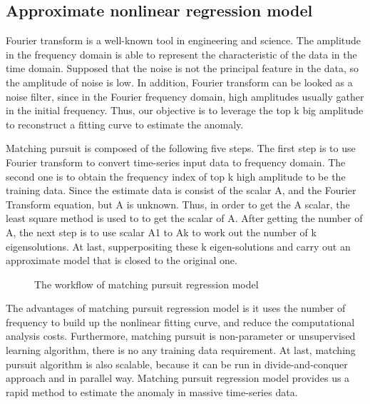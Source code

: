 \documentclass{vgtc}                          %
\begin{document}
\subsection{Approximate nonlinear regression model}

Fourier transform is a well-known tool in engineering and science. The amplitude in the frequency domain is able to represent the characteristic of the data in the time domain. Supposed that the noise is not the principal feature in the data, so the amplitude of noise is low. In addition, Fourier transform can be looked as a noise filter, since in the Fourier frequency domain, high amplitudes usually gather in the initial frequency. Thus, our objective is to leverage the top k big amplitude to reconstruct a fitting curve to estimate the anomaly. 

Matching pursuit is composed of the following five steps. The first step is to use Fourier transform to convert time-series input data to frequency domain. The second one is to obtain the frequency index of top k high amplitude to be the training data. Since the estimate data is consist of the scalar A, and the Fourier Transform equation, but A is unknown. Thus, in order to get the A scalar, the least square method is used to to get the scalar of A. After getting the number of A, the next step is to use scalar A1 to Ak to work out the number of k eigensolutions. At last, supperpositing these k eigen-solutions and carry out an approximate model that is closed to the original one.

\begin{figure}[htb]
	\caption{The workflow of matching pursuit regression model}
\end{figure}

The advantages of matching pursuit regression model is it uses the number of frequency to build up the nonlinear fitting curve, and reduce the computational analysis costs. Furthermore, matching pursuit is non-parameter or unsupervised learning algorithm, there is no any training data requirement. At last, matching pursuit algorithm is also scalable, because it can be run in divide-and-conquer approach and in parallel way. Matching pursuit regression model provides us a rapid method to estimate the anomaly in massive time-series data. 
\end{document}
